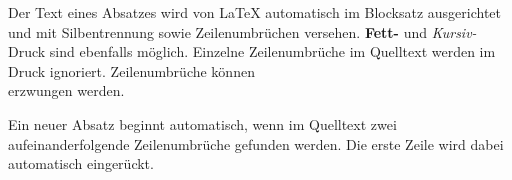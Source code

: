 \documentclass{article}
\begin{document}
Der Text eines Absatzes wird von LaTeX automatisch im
Blocksatz ausgerichtet und mit Silbentrennung sowie
Zeilenumbrüchen versehen. \textbf{Fett-} und
\textit{Kursiv-}Druck sind ebenfalls möglich.
Einzelne Zeilenumbrüche im Quelltext werden im Druck ignoriert.
Zeilenumbrüche können\\
erzwungen \newline
werden.

Ein neuer Absatz beginnt automatisch, wenn im Quelltext zwei
aufeinanderfolgende Zeilenumbrüche gefunden werden. Die erste
Zeile wird dabei automatisch eingerückt.
\end{document}
